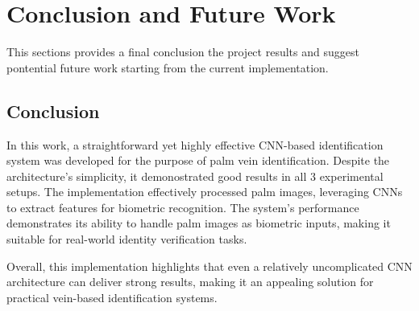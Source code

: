 \section{Conclusion and Future Work}
This sections provides a final conclusion the project results and suggest pontential future work starting from the current implementation.

\subsection{Conclusion}
In this work, a straightforward yet highly effective CNN-based identification system was developed for the purpose of palm vein identification. Despite the architecture's simplicity, it demonostrated good results in all 3 experimental setups. The implementation effectively processed palm images, leveraging CNNs to extract features for biometric recognition. The system's performance demonstrates its ability to handle palm images as biometric inputs, making it suitable for real-world identity verification tasks.

Overall, this implementation highlights that even a relatively uncomplicated CNN architecture can deliver strong results, making it an appealing solution for practical vein-based identification systems.

